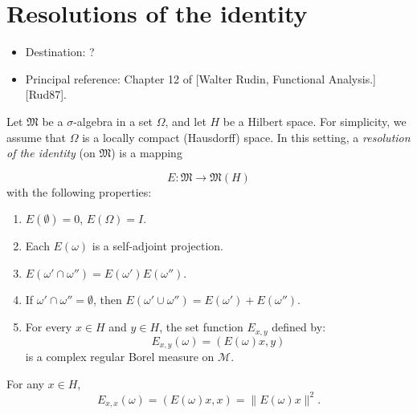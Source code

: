 \chapter{Resolutions of the identity}

\begin{itemize}
  \item Destination: ?
  \item Principal reference: Chapter 12 of [Walter Rudin, Functional Analysis.][Rud87].
\end{itemize}

\begin{definition}[Rudin 12.17]
  \label{def:resId}
  Let $\mathfrak{M}$ be a $\sigma$-algebra in a set $\Omega$, and let $H$ be a Hilbert space.
  For simplicity, we assume that $\Omega$ is a locally compact (Hausdorff) space.
  In this setting, a \emph{resolution of the identity} (on $\mathfrak{M}$) is a mapping

  \[
    E: \mathfrak{M} \to \mathfrak{M}(H)
  \]
  with the following properties:

  \begin{enumerate}
    \item \label{itm:Ra} \( E(\emptyset) = 0\), \(E(\Omega) = I\).
    \item \label{itm:Rb}  Each \( E(\omega) \) is a self-adjoint projection.
    \item \label{itm:Rc} \( E(\omega' \cap \omega'') = E(\omega')E(\omega'')\).
    \item \label{itm:Rd}  If \( \omega' \cap \omega'' = \emptyset \), then \( E(\omega' \cup \omega'') = E(\omega') + E(\omega'') \).
    \item \label{itm:Re}  For every \( x \in H \) and \( y \in H \), the set function \( E_{x,y} \) defined by:
          \[
            E_{x,y}(\omega) = (E(\omega)x, y)
          \]
          is a complex regular Borel measure on \( \mathcal{M} \).
  \end{enumerate}
\end{definition}


\begin{lemma}
  \label{lem:resId_x_x}
  For any $x \in H$,
  \[
    E_{x,x}(\omega) = (E(\omega)x, x) = \|E(\omega)x\|^2.
  \]
\end{lemma}

